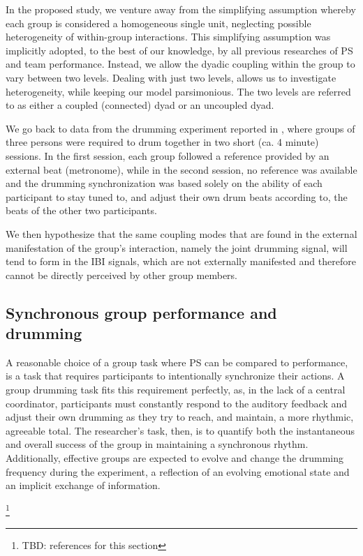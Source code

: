 \documentclass[a4paper, 11pt]{report}      %
\begin{document}
In the proposed study, we venture away from the simplifying assumption whereby each group is considered a homogeneous single unit, neglecting possible heterogeneity of within-group interactions. This simplifying assumption was implicitly adopted, to the best of our knowledge, by all previous researches of PS and team performance. Instead, we allow the dyadic coupling within the group to vary between two levels. Dealing with just two levels, allows us to investigate heterogeneity, while keeping our model parsimonious. The two levels are referred to as either a coupled (connected) dyad or an uncoupled dyad. 

We go back to data from the drumming experiment reported in \citet{gordon2020physio}, where groups of three persons were required to drum together in two short (ca. 4 minute) sessions. In the first session, each group followed a reference provided by an external beat (metronome), while in the second session, no reference was available and the drumming synchronization was based solely on the ability of each participant to stay tuned to, and adjust their own drum beats according to, the beats of the other two participants. 

 We then hypothesize that the same coupling modes that are found in the external manifestation of the group's interaction, namely the joint drumming signal, will tend to form in the IBI signals, which are not externally manifested and therefore cannot be directly perceived by other group members. 

\subsection{Synchronous group performance  and drumming}
A reasonable choice of a group task where PS can be compared to performance, is a task that requires participants to intentionally synchronize their actions. A group drumming task fits this requirement perfectly, as, in the lack of a central coordinator, participants must constantly respond to the auditory feedback and adjust their own drumming as they try to reach, and maintain, a more rhythmic, agreeable total. The researcher's task, then, is to quantify both the instantaneous and overall success of the group in maintaining a synchronous rhythm. Additionally, effective groups are expected to evolve and change the drumming frequency during the experiment, a reflection of an evolving emotional state and an implicit exchange of information.

\footnote{TBD: references for this section}
\end{document}
